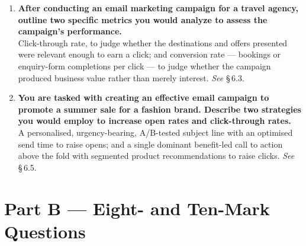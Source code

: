 \begin{enumerate}[leftmargin=2.2em,itemsep=1.1ex]
\item \textbf{After conducting an email marketing campaign for a travel agency,
      outline two specific metrics you would analyze to assess the campaign's
      performance.} \\
      Click-through rate, to judge whether the destinations and offers presented
      were relevant enough to earn a click; and conversion rate --- bookings or
      enquiry-form completions per click --- to judge whether the campaign
      produced business value rather than merely interest.
      \hfill\emph{See} \S\,6.3.

\item \textbf{You are tasked with creating an effective email campaign to promote
      a summer sale for a fashion brand. Describe two strategies you would employ
      to increase open rates and click-through rates.}
      \\
      A personalised, urgency-bearing, A/B-tested subject line with an optimised
      send time to raise opens; and a single dominant benefit-led call to action
      above the fold with segmented product recommendations to raise clicks.
      \hfill\emph{See} \S\,6.5.

\end{enumerate}

\section*{Part B --- Eight- and Ten-Mark Questions}

